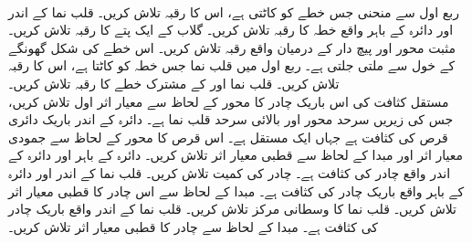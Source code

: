\\
ربع اول سے منحنی  جس خطے  کو کاٹتی ہے، اس کا رقبہ تلاش کریں۔
قلب نما  کے اندر اور دائرہ  کے باہر  واقع خطہ کا رقبہ تلاش کریں۔
گلاب  کے ایک پتے  کا رقبہ تلاش کریں۔
\wf{\unexpanded{
$12\pi$
}}
مثبت محور  اور پیچ دار   کے درمیان واقع رقبہ تلاش کریں۔ اس  خطے  کی شکل گھونگے کے خول سے ملتی جلتی ہے۔  
ربع اول میں قلب نما  جس خطہ کو کاٹتا ہے، اس کا رقبہ تلاش کریں۔
قلب نما  اور  کے مشترک خطے کا رقبہ تلاش کریں۔ 
\\
مستقل کثافت  کی اس  باریک چادر  کا محور  کے لحاظ سے معیار اثر اول تلاش کریں، جس کی زیریں سرحد محور  اور بالائی سرحد قلب نما  ہے۔
دائرہ  کے اندر باریک  دائری  قرص  کی کثافت  ہے جہاں  ایک مستقل ہے۔ اس قرص  کا   محور  کے لحاظ سے جمودی معیار اثر اور مبدا کے لحاظ سے قطبی معیار اثر تلاش کریں۔
دائرہ  کے باہر اور دائرہ  کے اندر واقع   چادر کی کثافت  ہے۔   چادر کی کمیت تلاش کریں۔
قلب نما  کے اندر اور دائرہ  کے باہر  واقع باریک چادر کی کثافت  ہے۔ مبدا کے لحاظ سے اس چادر کا قطبی معیار اثر تلاش کریں۔ 
قلب نما  کا وسطانی مرکز تلاش کریں۔
قلب نما  کے اندر واقع  باریک چادر کی کثافت  ہے۔ مبدا کے لحاظ سے چادر کا قطبی معیار اثر تلاش کریں۔

